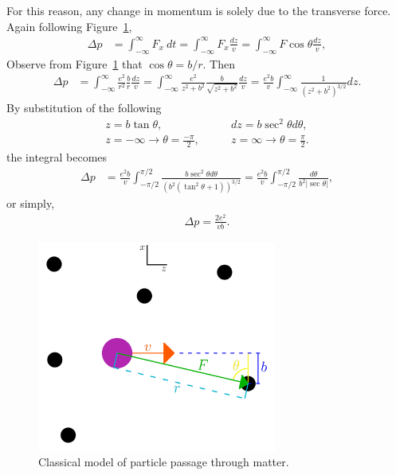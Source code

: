 For this reason, any change in momentum is solely due to the transverse force. Again following Figure~\ref{fig:bethe_bloch},
\begin{align*}
\Delta p &=\int_{-\infty} ^\infty F_x \ dt = \int_{-\infty} ^{\infty} F_x \frac{dz}{v} = \int_{-\infty} ^{\infty} F\cos{\theta}\frac{dz}{v},
\end{align*}
 Observe from Figure~\ref{fig:bethe_bloch} that $\cos\theta = b/r$. Then
\begin{align*}
\Delta p &= \int_{-\infty} ^{\infty} \frac{e^2}{r^2} \frac{b}{r} \frac{dz}{v} = \int_{-\infty} ^{\infty} \frac{e^2}{z^2+b^2} \frac{b}{\sqrt{z^2+b^2}} \frac{dz}{v}= \frac{e^2 b}{v} \int_{-\infty} ^{\infty} \frac{1}{(z^2+b^2)^{3/2}}dz.
\end{align*}
By substitution of the following
\begin{align*}
z = b\tan{\theta},&\qquad dz = b\sec^2{\theta} d\theta,\\
z=-\infty\rightarrow \theta = \frac{-\pi}{2},&\qquad z=\infty \rightarrow \theta = \frac{\pi}{2}.
\end{align*}
the integral becomes
\begin{align*}
\Delta p &=\frac{e^2 b}{v}\int_{-\pi/2} ^{\pi/2} \frac{b\sec^2{\theta} d\theta}{(b^2(\tan^2{\theta}+1))^{3/2}} =\frac{e^2 b}{v}\int_{-\pi/2} ^{\pi/2} \frac{d\theta}{b^2 |\sec{\theta}|},
\end{align*}
or simply,
\begin{align*}
\Delta p=\frac{2e^2}{vb}.
\end{align*}

\begin{figure}[h!]
  \centering
    \includegraphics[width=0.7\textwidth]{Figures/bethe_bloch} 
  \caption{Classical model of particle passage through matter.}
  \label{fig:bethe_bloch}
\end{figure}

